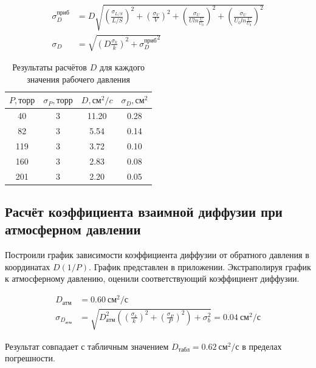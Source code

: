 \documentclass[a4paper, 12pt]{article}
\begin{document}
        \begin{align*}
            \sigma_D^{приб} &= D \sqrt{\left( \frac{\sigma_{L/S}}{L/S} \right)^2 + \left( \frac{\sigma_V}{V} \right)^2 + \left( \frac{\sigma_U}{U ln \frac{U}{U_0}} \right)^2 + \left( \frac{\sigma_U}{U_0 ln \frac{U}{U_0}} \right)^2}\\
            \sigma_D &= \sqrt{\left( D \frac{\sigma_k}{k} \right)^2 + {\sigma_D^{приб}}^2}
        \end{align*}

        \begin{table}[!ht]
            \centering
            \begin{tabular}{|c|c|c|c|}
            \hline
                $P, торр$ & $\sigma_P, торр$ & $D, см^2/c$ & $\sigma_D, см^2$ \\ \hline
                40 & 3 & 11.20 & 0.28 \\ \hline
                82 & 3 & 5.54 & 0.14 \\ \hline
                119 & 3 & 3.72 & 0.10 \\ \hline
                160 & 3 & 2.83 & 0.08 \\ \hline
                201 & 3 & 2.20 & 0.05 \\ \hline
            \end{tabular}

            \caption{Результаты расчётов $D$ для каждого значения рабочего давления}
            \label{coeffs}
        \end{table}

    \subsection{Расчёт коэффициента взаимной диффузии при атмосферном давлении}

        Построили график зависимости коэффициента диффузии от обратного давления в координатах $D(1/P)$. График представлен в приложении. Экстраполируя график к атмосферному давлению, оценили соответствующий коэффициент диффузии.

        \begin{align*}
            D_{атм} &= 0.60~см^2/с\\
            \sigma_{D_{атм}} &=  \sqrt{ D_{атм}^2 \left( \left( \frac{\sigma_k}{k} \right)^2 + \left( \frac{\sigma_P}{P} \right)^2 \right) + \sigma_b^2} = 0.04~см^2/с
        \end{align*}

        Результат совпадает с табличным значением $D_{табл} = 0.62~см^2/с$ в пределах погрешности.
\end{document}
